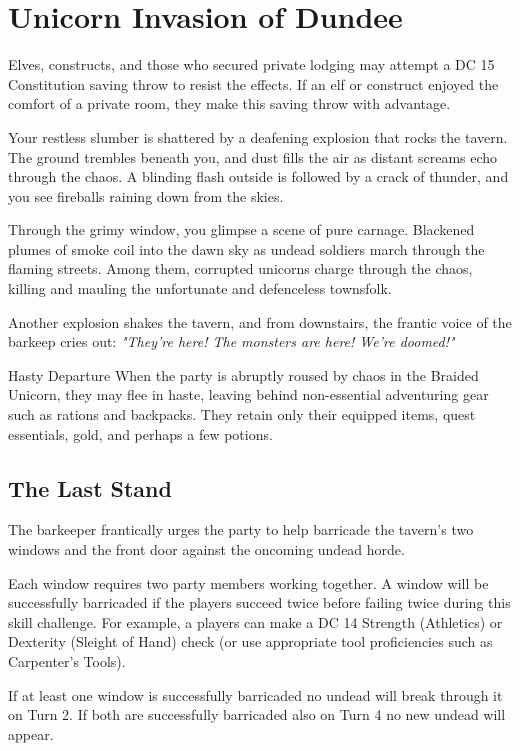 \chapter*{Unicorn Invasion of Dundee}

{\entryfont Elves, constructs, and those who secured private lodging may attempt a DC 15 Constitution saving throw to resist the effects. If an elf or construct enjoyed the comfort of a private room, they make this saving throw with advantage.}

\begin{DndReadAloud}
	Your restless slumber is shattered by a deafening explosion that rocks the tavern. The ground trembles beneath you, and dust fills the air as distant screams echo through the chaos. A blinding flash outside is followed by a crack of thunder, and you see fireballs raining down from the skies.

	Through the grimy window, you glimpse a scene of pure carnage. Blackened plumes of smoke coil into the dawn sky as undead soldiers march through the flaming streets. Among them, corrupted unicorns charge through the chaos, killing and mauling the unfortunate and defenceless townsfolk.

	Another explosion shakes the tavern, and from downstairs, the frantic voice of the barkeep cries out: \textit{"They're here! The monsters are here! We're doomed!"}
\end{DndReadAloud}

\begin{DndOptionalRule}{Hasty Departure}\label{or:HastyDeparture}%
	When the party is abruptly roused by chaos in the Braided Unicorn, they may flee in haste, leaving behind non-essential adventuring gear such as rations and backpacks. They retain only their equipped items, quest essentials, gold, and perhaps a few potions.
\end{DndOptionalRule}

\section*{The Last Stand}
{\entryfont The barkeeper frantically urges the party to help barricade the tavern's two windows and the front door against the oncoming undead horde.

Each window requires two party members working together. A window will be successfully barricaded if the players succeed twice before failing twice during this skill challenge. For example, a players can make a DC 14 Strength (Athletics) or Dexterity (Sleight of Hand) check (or use appropriate tool proficiencies such as Carpenter's Tools).

If at least one window is successfully barricaded no undead will break through it on Turn 2. If both are successfully barricaded also on Turn 4 no new undead will appear.}
